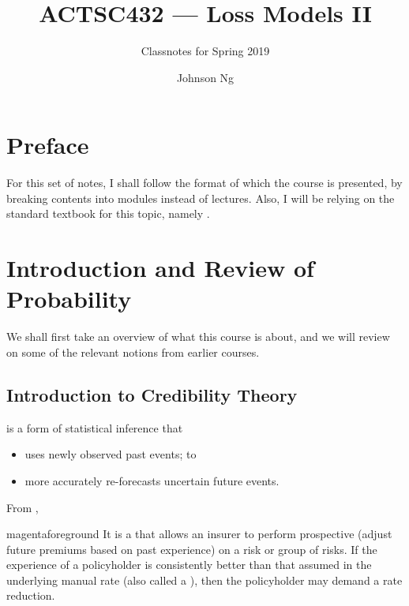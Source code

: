 \documentclass[notoc,notitlepage]{tufte-book}
\title{ACTSC432 --- Loss Models II}
\author{Johnson Ng}
\subtitle{Classnotes for Spring 2019}
\begin{document}


\chapter*{Preface}%
\label{chp:preface}

For this set of notes, I shall follow the format of which the course is
presented, by breaking contents into modules instead of lectures. Also, I will
be relying on the standard textbook for this topic, namely
\citealt{klugman2012}.


\label{part:pre_requiresite_review}

\chapter{Introduction and Review of Probability}%
\label{chp:introduction_and_review_of_probability}

We shall first take an overview of what this course is about, and we will review
on some of the relevant notions from earlier courses.

\section{Introduction to Credibility Theory}%
\label{sec:introduction_to_credibility_theory}

 is a form of statistical inference that
\begin{itemize}
  \item uses newly observed past events; to
  \item more accurately re-forecasts uncertain future events.
\end{itemize}
From \citealt{klugman2012},
\begin{quotebox}{magenta}{foreground}
  It is a  that allows an insurer to perform
  prospective  (adjust future premiums based
  on past experience) on a risk or group of risks. If the experience of a
  policyholder is consistently better than that assumed in the underlying manual
  rate (also called a ), then the policyholder may demand
  a rate reduction.
\end{quotebox}
\end{document}
